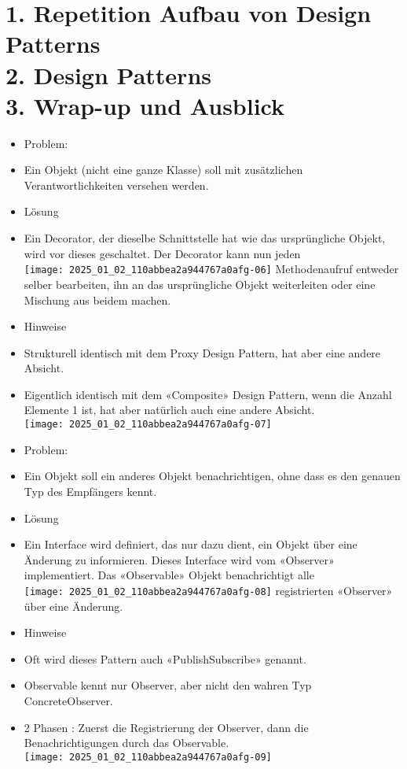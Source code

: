 \documentclass[10pt]{article}
\begin{document}
\section*{1. Repetition Aufbau von Design Patterns \\
 2. Design Patterns \\
 3. Wrap-up und Ausblick }
\begin{itemize}
  \item Problem:
  \item Ein Objekt (nicht eine ganze Klasse) soll mit zusätzlichen Verantwortlichkeiten versehen werden.
  \item Lösung
  \item Ein Decorator, der dieselbe Schnittstelle hat wie das ursprüngliche Objekt, wird vor dieses geschaltet. Der Decorator kann nun jeden\\
\texttt{[image: 2025\_01\_02\_110abbea2a944767a0afg-06]} Methodenaufruf entweder selber bearbeiten, ihn an das ursprüngliche Objekt weiterleiten oder eine Mischung aus beidem machen.
  \item Hinweise
  \item Strukturell identisch mit dem Proxy Design Pattern, hat aber eine andere Absicht.
  \item Eigentlich identisch mit dem «Composite» Design Pattern, wenn die Anzahl Elemente 1 ist, hat aber natürlich auch eine andere Absicht.\\
\texttt{[image: 2025\_01\_02\_110abbea2a944767a0afg-07]}
  \item Problem:
  \item Ein Objekt soll ein anderes Objekt benachrichtigen, ohne dass es den genauen Typ des Empfängers kennt.
  \item Lösung
  \item Ein Interface wird definiert, das nur dazu dient, ein Objekt über eine Änderung zu informieren. Dieses Interface wird vom «Observer» implementiert. Das «Observable» Objekt benachrichtigt alle\\
\texttt{[image: 2025\_01\_02\_110abbea2a944767a0afg-08]} registrierten «Observer» über eine Änderung.
  \item Hinweise
  \item Oft wird dieses Pattern auch «PublishSubscribe» genannt.
  \item Observable kennt nur Observer, aber nicht den wahren Typ ConcreteObserver.
  \item 2 Phasen : Zuerst die Registrierung der Observer, dann die Benachrichtigungen durch das Observable.\\
\texttt{[image: 2025\_01\_02\_110abbea2a944767a0afg-09]}
\end{itemize}
\end{document}
